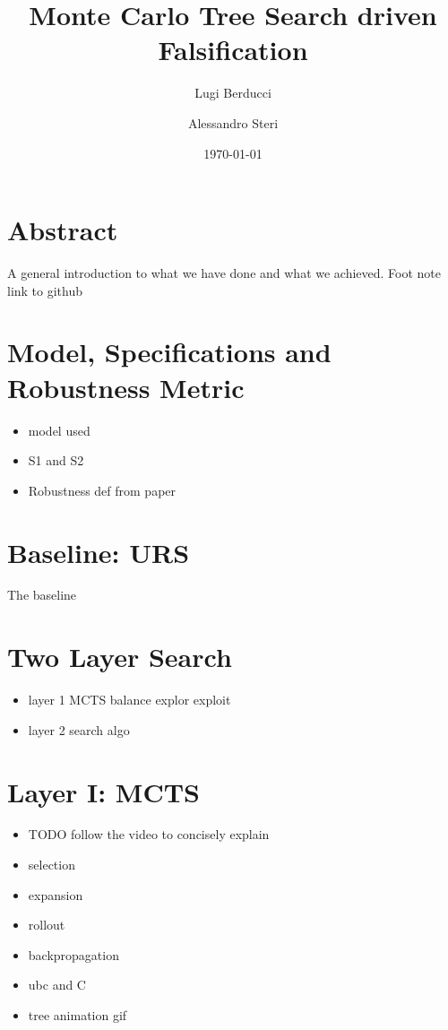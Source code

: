 \documentclass[11pt]{article}
\title{ Monte Carlo Tree Search driven Falsification }
\author{ Lugi Berducci \and Alessandro Steri }
\date{\today}
\begin{document}
\maketitle	
\pagebreak

\tableofcontents
\pagebreak


\section{ Abstract }
A general introduction to what we have done and what we achieved.
Foot note link to github
\pagebreak


\section{ Model, Specifications and Robustness Metric }
\begin{itemize}
    \item model used
    \item S1 and S2
    \item Robustness def from paper
\end{itemize}

\section{ Baseline: URS }
The baseline

\section{ Two Layer Search }
\begin{itemize}
    \item layer 1 MCTS balance explor exploit
    \item layer 2 search algo
\end{itemize}

\section{ Layer I: MCTS }
\begin{itemize}
    \item TODO follow the video to concisely explain
    \item selection
    \item expansion
    \item rollout
    \item backpropagation
    \item ubc and C
    \item tree animation gif
\end{itemize}
\end{document}
